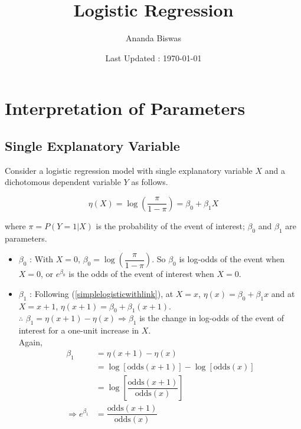 \documentclass[11pt, a4paper]{article}
\title{Logistic Regression}
\author{Ananda Biswas}
\date{Last Updated : \today}
\begin{document}
\maketitle

\tableofcontents

\newpage

\section{Interpretation of Parameters}

\subsection{Single Explanatory Variable}

Consider a logistic regression model with single explanatory variable $X$ and a dichotomous dependent variable $Y$ as follows.

\begin{equation}\label{simplelogisticwithlink}
\eta(X) = \log \left( \dfrac{\pi}{1 - \pi} \right) = \beta_0 + \beta_1 X
\end{equation}

where $\pi = P(Y = 1 |X)$ is the probability of the event of interest; $\beta_0$ and $\beta_1$ are parameters.

\begin{itemize}
\item $\beta_0$ : With $X = 0$, $\beta_0 = \log \left( \dfrac{\pi}{1 - \pi} \right)$. So $\beta_0$ is log-odds of the event when $X = 0$, or $e^{\beta_0}$ is the odds of the event of interest when $X = 0$.

\item $\beta_1$ : Following (\ref{simplelogisticwithlink}), at $X = x$, $\eta(x) = \beta_0 + \beta_1 x$ and at $X = x+1$, $\eta(x+1) = \beta_0 + \beta_1 (x+1)$. \\[0.25em]

$\therefore$ $\beta_1 = \eta(x+1) - \eta(x) \Rightarrow \beta_1$ is the change in log-odds of the event of interest for a one-unit increase in $X$. \\[0.15em]

Again,
\begin{align*}
\beta_1 &= \eta(x+1) - \eta(x) \\[0.5em]
&= \log [\text{odds}(x+1)] - \log [\text{odds}(x)] \\[0.5em]
&= \log \left[ \dfrac{\text{odds}(x+1)}{\text{odds}(x)} \right] \\[0.5em]
\Rightarrow e^{\beta_1} &= \dfrac{\text{odds}(x+1)}{\text{odds}(x)}
\end{align*}
\end{itemize}
\end{document}
